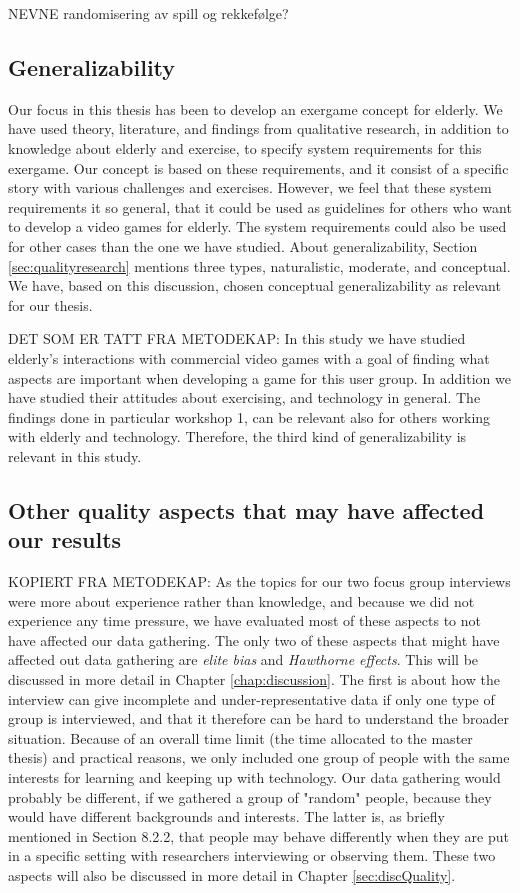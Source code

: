 NEVNE randomisering av spill og rekkefølge?
    
\subsection{Generalizability}    
Our focus in this thesis has been to develop an exergame concept for elderly. We have used theory, literature, and findings from qualitative research, in addition to knowledge about elderly and exercise, to specify system requirements for this exergame. Our concept is based on these requirements, and it consist of a specific story with various challenges and exercises. However, we feel that these system requirements it so general, that it could be used as guidelines for others who want to develop a video games for elderly. The system requirements could also be used for other cases than the one we have studied. About generalizability, Section \ref{sec:qualityresearch} mentions three types, naturalistic, moderate, and conceptual. We have, based on this discussion, chosen conceptual generalizability as relevant for our thesis.    

DET SOM ER TATT FRA METODEKAP: In this study we have studied elderly's interactions with commercial video games with a goal of finding what aspects are important when developing a game for this user group. In addition we have studied their attitudes about exercising, and technology in general. The findings done in particular workshop 1, can be relevant also for others working with elderly and technology. Therefore, the third kind of generalizability is relevant in this study.

\subsection{Other quality aspects that may have affected our results}
KOPIERT FRA METODEKAP:  As the topics for our two focus group interviews were more about experience rather than knowledge, and because we did not experience any time pressure, we have evaluated most of these aspects to not have affected our data gathering. The only two of these aspects that might have affected out data gathering are \emph{elite bias} and \emph{Hawthorne effects}. This will be discussed in more detail in Chapter \ref{chap:discussion}. The first is about how the interview can give incomplete and under-representative data  if only one type of group is interviewed, and that it therefore can be hard to understand the broader situation. Because of an overall time limit (the time allocated to the master thesis) and practical reasons, we only included one group of people with the same interests for learning and keeping up with technology. Our data gathering would probably be different, if we gathered a group of "random" people, because they would have different backgrounds and interests. The latter is, as briefly mentioned in Section 8.2.2, that people may behave differently when they are put in a specific setting with researchers interviewing or observing them. These two aspects will also be discussed in more detail in Chapter \ref{sec:discQuality}.



